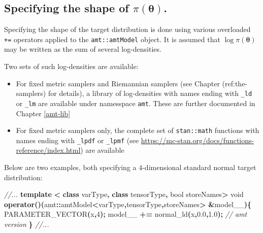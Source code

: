 \documentclass[
]{book}
\newenvironment{Shaded}{\begin{snugshade}}{\end{snugshade}}
\newcommand{\CommentTok}[1]{\textcolor[rgb]{0.56,0.35,0.01}{\textit{#1}}}
\newcommand{\DataTypeTok}[1]{\textcolor[rgb]{0.13,0.29,0.53}{#1}}
\newcommand{\DecValTok}[1]{\textcolor[rgb]{0.00,0.00,0.81}{#1}}
\newcommand{\FloatTok}[1]{\textcolor[rgb]{0.00,0.00,0.81}{#1}}
\newcommand{\KeywordTok}[1]{\textcolor[rgb]{0.13,0.29,0.53}{\textbf{#1}}}
\newcommand{\NormalTok}[1]{#1}
\newcommand{\OperatorTok}[1]{\textcolor[rgb]{0.81,0.36,0.00}{\textbf{#1}}}
\begin{document}
\hypertarget{specifying-the-shape-of-piboldsymbol-theta.}{%
\subsection{\texorpdfstring{Specifying the shape of \(\pi(\boldsymbol \theta)\).}{Specifying the shape of \textbackslash pi(\textbackslash boldsymbol \textbackslash theta).}}\label{specifying-the-shape-of-piboldsymbol-theta.}}

Specifying the shape of the target distribution is done using various overloaded \texttt{+=} operators applied to the \texttt{amt::amtModel} object. It is assumed that \(\log \pi(\boldsymbol \theta)\) may be written as the sum of
several log-densities.

Two sets of such log-densities are available:

\begin{itemize}
\item
  For fixed metric samplers and Riemannian samplers (see Chapter (ref:the-samplers) for details), a library of
  log-densities with names ending with \texttt{\_ld} or \texttt{\_lm} are available under namesspace \texttt{amt}. These are further documented in Chapter \ref{amt-lib}
\item
  For fixed metric samplers only, the complete set of \texttt{stan::math} functions with names ending with \texttt{\_lpdf} or \texttt{\_lpmf} (see \url{https://mc-stan.org/docs/functions-reference/index.html}) are available
\end{itemize}

Below are two examples, both specifying a 4-dimensional standard normal target distribution:

\begin{Shaded}
\begin{Highlighting}[]
\CommentTok{//...}
  \KeywordTok{template} \OperatorTok{\textless{}} \KeywordTok{class}\NormalTok{ varType}\OperatorTok{,} \KeywordTok{class}\NormalTok{ tensorType}\OperatorTok{,} \DataTypeTok{bool}\NormalTok{ storeNames}\OperatorTok{\textgreater{}}
  \DataTypeTok{void} \KeywordTok{operator}\OperatorTok{()(}\NormalTok{amt}\OperatorTok{::}\NormalTok{amtModel}\OperatorTok{\textless{}}\NormalTok{varType}\OperatorTok{,}\NormalTok{tensorType}\OperatorTok{,}\NormalTok{storeNames}\OperatorTok{\textgreater{}} \OperatorTok{\&}\NormalTok{model\_\_}\OperatorTok{)\{}
\NormalTok{    PARAMETER\_VECTOR}\OperatorTok{(}\NormalTok{x}\OperatorTok{,}\DecValTok{4}\OperatorTok{);}
\NormalTok{    model\_\_ }\OperatorTok{+=}\NormalTok{ normal\_ld}\OperatorTok{(}\NormalTok{x}\OperatorTok{,}\FloatTok{0.0}\OperatorTok{,}\FloatTok{1.0}\OperatorTok{);} \CommentTok{// amt version}
  \OperatorTok{\}}
\CommentTok{//...}
\end{Highlighting}
\end{Shaded}
\end{document}
